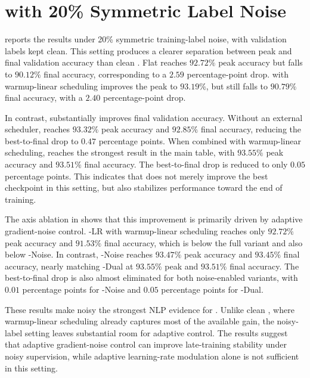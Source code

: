 \section{\agnews{} with 20\% Symmetric Label Noise}
\label{sec:results-agnews-noisy}



 reports the \agnews{} results under 20\% symmetric training-label noise, with validation labels kept clean. This setting produces a clearer separation between peak and final validation accuracy than clean \agnews{}. Flat \adamw{} reaches $92.72\%$ peak accuracy but falls to $90.12\%$ final accuracy, corresponding to a $2.59$ percentage-point drop. \adamw{} with warmup-linear scheduling improves the peak to $93.19\%$, but still falls to $90.79\%$ final accuracy, with a $2.40$ percentage-point drop.

In contrast, \method{} substantially improves final validation accuracy. Without an external scheduler, \method{} reaches $93.32\%$ peak accuracy and $92.85\%$ final accuracy, reducing the best-to-final drop to $0.47$ percentage points. When combined with warmup-linear scheduling, \method{} reaches the strongest result in the main table, with $93.55\%$ peak accuracy and $93.51\%$ final accuracy. The best-to-final drop is reduced to only $0.05$ percentage points. This indicates that \method{} does not merely improve the best checkpoint in this setting, but also stabilizes performance toward the end of training.

The axis ablation in  shows that this improvement is primarily driven by adaptive gradient-noise control. \method{}-LR with warmup-linear scheduling reaches only $92.72\%$ peak accuracy and $91.53\%$ final accuracy, which is below the full \method{} variant and also below \method{}-Noise. In contrast, \method{}-Noise reaches $93.47\%$ peak accuracy and $93.45\%$ final accuracy, nearly matching \method{}-Dual at $93.55\%$ peak and $93.51\%$ final accuracy. The best-to-final drop is also almost eliminated for both noise-enabled variants, with $0.01$ percentage points for \method{}-Noise and $0.05$ percentage points for \method{}-Dual.

These results make noisy \agnews{} the strongest NLP evidence for \method{}. Unlike clean \agnews{}, where warmup-linear scheduling already captures most of the available gain, the noisy-label setting leaves substantial room for adaptive control. The results suggest that adaptive gradient-noise control can improve late-training stability under noisy supervision, while adaptive learning-rate modulation alone is not sufficient in this setting.

